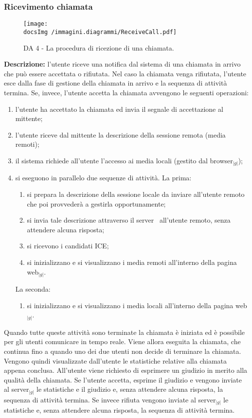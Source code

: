 		\subsubsection{Ricevimento chiamata}
		\begin{center}
			\begin{figure}[htbp]
				\centering
				\texttt{[image: \\docsImg /immagini.diagrammi/ReceiveCall.pdf]}
			\caption{DA 4 - La procedura di ricezione di una chiamata.}	
			\end{figure}
		\end{center}		
		\noindent \textbf{Descrizione: }l'utente riceve una notifica dal sistema di una chiamata in arrivo che può essere accettata o rifiutata. Nel caso la chiamata venga rifiutata, l'utente esce dalla fase di gestione della chiamata in arrivo e la sequenza di attività termina. Se, invece, l'utente accetta la chiamata avvengono le seguenti operazioni:
		\begin{enumerate}
			\item l'utente ha accettato la chiamata ed invia il segnale di accettazione al mittente; 
			\item l'utente riceve dal mittente la descrizione della sessione remota (media remoti);
			\item il sistema richiede all'utente l'accesso ai media locali (gestito dal browser$_{|g|}$);
			\item si eseguono in parallelo due sequenze di attività. La prima:
				\begin{enumerate}
					\item si prepara la descrizione della sessione locale da inviare all'utente remoto che poi provvederà a gestirla opportunamente; 
					\item si invia tale descrizione attraverso il server\g~ all'utente remoto, senza attendere alcuna risposta;
					\item si ricevono i candidati ICE;
					\item si inizializzano e si visualizzano i media remoti all'interno della pagina web$_{|g|}$.
				\end{enumerate}
			La seconda:
			\begin{enumerate}
			 	\item si inizializzano e si visualizzano i media locali all'interno della pagina web$_{|g|}$.
			\end{enumerate}
		\end{enumerate} 
		Quando tutte queste attività sono terminate la chiamata è iniziata ed è possibile per gli utenti comunicare in tempo reale. 
		Viene allora eseguita la chiamata, che continua fino a quando uno dei due utenti non decide di terminare la chiamata.
		Vengono quindi visualizzate dall'utente le statistiche relative alla chiamata appena conclusa. All'utente viene richiesto di esprimere un giudizio in merito alla qualità della chiamata. Se l'utente accetta, esprime il giudizio e vengono inviate al server$_{|g|}$ le statistiche e il giudizio e, senza attendere alcuna risposta, la sequenza di attività termina. Se invece rifiuta vengono inviate al server$_{|g|}$ le statistiche e, senza attendere alcuna risposta, la sequenza di attività termina.
		\newpage
		
